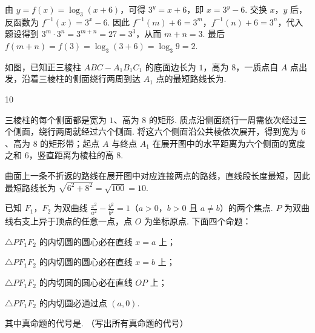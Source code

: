 \begin{solution}
由 \(y=f(x)=\log_3(x+6)\)，可得 \(3^y=x+6\)，即 \(x=3^y-6\). 交换 \(x\)，\(y\) 后，反函数为 \(f^{-1}(x)=3^x-6\). 因此 \(f^{-1}(m)+6=3^m\)，\(f^{-1}(n)+6=3^n\)，代入题设得到 \(3^m\cdot3^n=3^{m+n}=27=3^3\)，从而 \(m+n=3\). 最后 \(f(m+n)=f(3)=\log_3(3+6)=\log_3 9=2\).
\end{solution}

\begin{problem}
如图，已知正三棱柱 \(ABC - A_{1}B_{1}C_{1}\) 的底面边长为 \(1\)，高为 \(8\)，一质点自 \(A\) 点出发，沿着三棱柱的侧面绕行两周到达 \(A_{1}\) 点的最短路线长为\fillinblank{}.

\end{problem}

\begin{answer}
10
\end{answer}

\begin{solution}
三棱柱的每个侧面都是宽为 \(1\)、高为 \(8\) 的矩形. 质点沿侧面绕行一周需依次经过三个侧面，绕行两周就经过六个侧面. 将这六个侧面沿公共棱依次展开，得到宽为 \(6\)、高为 \(8\) 的矩形带；起点 \(A\) 与终点 \(A_1\) 在展开图中的水平距离为六个侧面的宽度之和 \(6\)，竖直距离为棱柱的高 \(8\).

曲面上一条不折返的路线在展开图中对应连接两点的路线，直线段长度最短，因此最短路线长为 \(\sqrt{6^2+8^2}=\sqrt{100}=10\).
\end{solution}

\begin{problem}
已知 \(F_{1}\)，\(F_{2}\) 为双曲线 \(\frac{x^{2}}{a^{2}} - \frac{y^{2}}{b^{2}} = 1\)（\(a > 0\)，\(b > 0\) 且 \(a \neq b\)）的两个焦点. \(P\) 为双曲线右支上异于顶点的任意一点，点 \(O\) 为坐标原点. 下面四个命题：

\begin{circlelist}
\item \(\triangle PF_{1}F_{2}\) 的内切圆的圆心必在直线 \(x = a\) 上；
\item \(\triangle PF_{1}F_{2}\) 的内切圆的圆心必在直线 \(x = b\) 上；
\item \(\triangle PF_{1}F_{2}\) 的内切圆的圆心必在直线 \(OP\) 上；
\item \(\triangle PF_{1}F_{2}\) 的内切圆必通过点 \((a, 0)\).
\end{circlelist}

其中真命题的代号是\fillinblank{}. （写出所有真命题的代号）
\end{problem}

